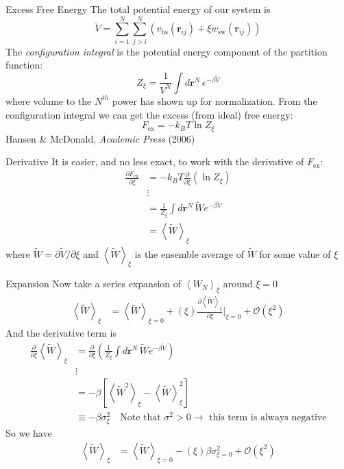 \documentclass[xcolor=dvipsnames]{beamer}
\newcommand{\mycite}[3]{{\tiny #1, \textit{#2} (#3)}}
\newcommand{\kT}{\ensuremath{k_{B}T}}
\newcommand{\Fex}{\ensuremath{F_\text{ex}}}
\newcommand{\rr}{\ensuremath{\mathbf{r}}}
\newcommand{\Vtilde}{\ensuremath{\widetilde{V}}}
\newcommand{\Wtilde}{\ensuremath{\widetilde{W}}}
\begin{document}
\begin{frame}{Excess Free Energy}
  The total potential energy of our system is \[ \Vtilde = \sum_{i=1}^N\sum_{j>i}^N \left( v_\text{hs}(\rr_{ij}) + \xi w_\text{sw}(\rr_{ij}) \right) \]
  The \emph{configuration integral} is the potential energy component of the partition function: \[ Z_\xi = \frac{1}{V^N}\int d\rr^N\, e^{-\beta \Vtilde} \] where volume to the $N^{th}$ power has shown up for normalization.
  From the configuration integral we can get the excess (from ideal) free energy:\[ \Fex = -\kT\ln Z_\xi \]
  \mycite{Hansen \& McDonald}{Academic Press}{2006}
\end{frame}

\begin{frame}{Derivative}
  It is easier, and no less exact, to work with the derivative of \Fex:
    \begin{align*}
    \frac{\partial \Fex}{\partial\xi} &=-\kT\frac{\partial}{\partial\xi}\left( \ln Z_\xi \right)  \\
    &\vdots \\
    &= \frac{1}{Z_\xi} \int d\rr^N\, \Wtilde e^{-\beta \Vtilde} \\
    &= \left\langle \Wtilde \right\rangle_{\xi}
  \end{align*}
  where $\Wtilde = \partial \Vtilde/\partial \xi$ and $\left\langle \Wtilde\right\rangle_{\xi}$ is the ensemble average of $\Wtilde$ for some value of $\xi$
\end{frame}


\begin{frame}{Expansion}
  Now take a series expansion of $\left\langle W_N\right\rangle_{\xi}$ around $\xi = 0$
  \begin{align*}
    \left\langle \Wtilde \right\rangle_{\xi} &= \left\langle \Wtilde\right\rangle_{\xi = 0} + (\xi)\frac{\partial\left\langle \Wtilde \right\rangle_{\xi}}{\partial\xi}\bigg|_{\xi = 0} + \mathcal{O}(\xi^2)
  \end{align*}
  And the derivative term is
  \begin{align*}
    \frac{\partial}{\partial\xi}\left\langle \Wtilde \right\rangle_{\xi} &= \frac{\partial}{\partial\xi}\left( \frac{1}{Z_\xi}\int d\rr^N\, \Wtilde e^{-\beta \Vtilde}\right)  \\
    &\vdots  \\
    &= -\beta\left[ \left\langle \Wtilde^2 \right\rangle_{\xi} - \left\langle \Wtilde \right\rangle_{\xi}^2 \right]  \\
    &\equiv -\beta\sigma_{\xi}^2 \quad \text{Note that $\sigma^2 > 0 \rightarrow$ this term is always negative}
  \end{align*}
  So we have
  \begin{align*}
    \left\langle \Wtilde \right\rangle_{\xi} &= \left\langle \Wtilde\right\rangle_{\xi = 0} - (\xi)\beta\sigma_{\xi=0}^2 + \mathcal{O}(\xi^2)
  \end{align*}
\end{frame}
\end{document}

